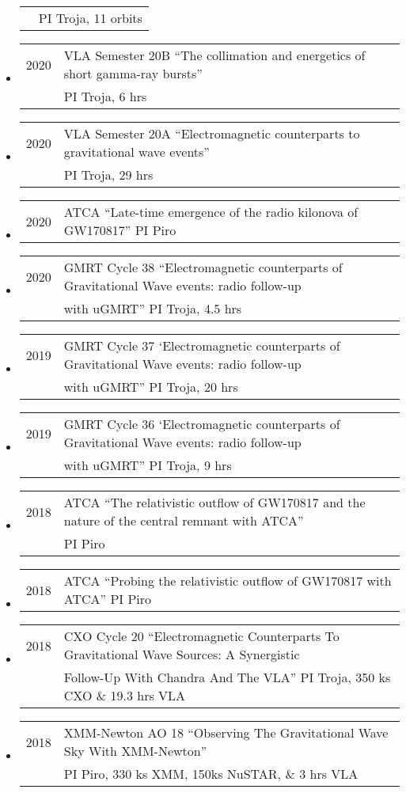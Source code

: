 \begin{itemize}
\begin{tabular}{ll}
	&  PI Troja, 11 orbits
\end{tabular}
\item \begin{tabular}{ll}
2020	& VLA Semester 20B ``The collimation and energetics of short gamma-ray bursts''\\
	&  PI Troja, 6 hrs
\end{tabular}
\item \begin{tabular}{ll}
2020	& VLA Semester 20A ``Electromagnetic counterparts to gravitational wave events''\\
	&  PI Troja, 29 hrs
\end{tabular}
\item \begin{tabular}{ll}
2020	& ATCA ``Late-time emergence of the radio kilonova of GW170817'' PI Piro
\end{tabular}
\item \begin{tabular}{ll}
2020	& GMRT Cycle 38 ``Electromagnetic counterparts of Gravitational Wave events: radio follow-up\\
	&  with uGMRT'' PI Troja, 4.5 hrs
\end{tabular}
\item \begin{tabular}{ll}
2019	& GMRT Cycle 37 `Electromagnetic counterparts of Gravitational Wave events: radio follow-up\\
	&  with uGMRT'' PI Troja, 20 hrs
\end{tabular}
\item \begin{tabular}{ll}
2019	& GMRT Cycle 36 `Electromagnetic counterparts of Gravitational Wave events: radio follow-up\\
	&  with uGMRT'' PI Troja, 9 hrs
\end{tabular}
\item \begin{tabular}{ll}
2018	& ATCA ``The relativistic outflow of GW170817 and the nature of the central remnant with ATCA''\\
	&  PI Piro
\end{tabular}
\item \begin{tabular}{ll}
2018	& ATCA ``Probing the relativistic outflow of GW170817 with ATCA'' PI Piro
\end{tabular}
\item \begin{tabular}{ll}
2018	& CXO Cycle 20 ``Electromagnetic Counterparts To Gravitational Wave Sources: A Synergistic\\
	&  Follow-Up With Chandra And The VLA'' PI Troja, 350 ks CXO \& 19.3 hrs VLA
\end{tabular}
\item \begin{tabular}{ll}
2018	& XMM-Newton AO 18  ``Observing The Gravitational Wave Sky With XMM-Newton''\\
	&  PI Piro, 330 ks XMM, 150ks NuSTAR, \& 3 hrs VLA
\end{tabular}
\end{itemize}

